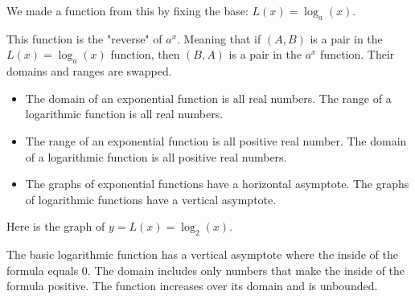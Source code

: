 \documentclass{ximera}
\begin{document}
We made a function from this by fixing the base:  $L(x) = \log_a(x)$.


This function is the "reverse" of $a^x$.  Meaning that if $(A, B)$ is a pair in the $L(x) = \log_a(x)$ function, then $(B, A)$ is a pair in the $a^x$ function. Their domains and ranges are swapped.


\begin{itemize}

\item The domain of an exponential function is all real numbers. The range of a logarithmic function is all real numbers.  


\item The range of an exponential function is all positive real number. The domain of a logarithmic function is all positive real numbers.

\item The graphs of exponential functions have a horizontal asymptote. The graphs of logarithmic functions have a vertical asymptote. 

\end{itemize}






Here is the graph of $y = L(x) = \log_2(x)$.

\begin{image}
\end{image}





The basic logarithmic function has a vertical asymptote where the inside of the formula equals $0$.  The domain includes only numbers that make the inside of the formula positive. The function increases over its domain and is unbounded.
\end{document}
